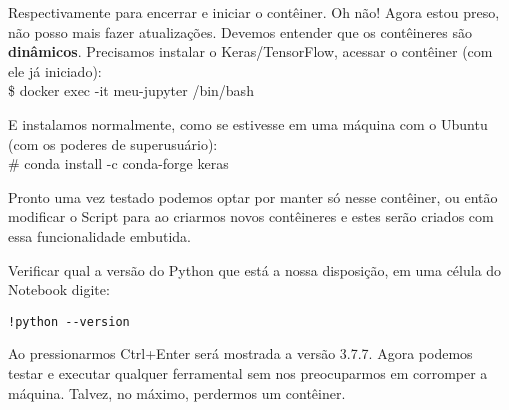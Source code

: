Respectivamente para encerrar e iniciar o contêiner. Oh não! Agora estou preso, não posso mais fazer atualizações. Devemos entender que os contêineres são \textbf{dinâmicos}. Precisamos instalar o Keras/TensorFlow, acessar o contêiner (com ele já iniciado): \\
{\ttfamily\$ docker exec -it meu-jupyter /bin/bash}

E instalamos normalmente, como se estivesse em uma máquina com o Ubuntu (com os poderes de superusuário): \\
{\ttfamily\# conda install -c conda-forge keras}

Pronto uma vez testado podemos optar por manter só nesse contêiner, ou então modificar o Script para ao criarmos novos contêineres e estes serão criados com essa funcionalidade embutida.

Verificar qual a versão do Python que está a nossa disposição, em uma célula do Notebook digite:
\begin{lstlisting}
!python --version
\end{lstlisting}

Ao pressionarmos Ctrl+Enter será mostrada a versão 3.7.7. Agora podemos testar e executar qualquer ferramental sem nos preocuparmos em corromper a máquina. Talvez, no máximo, perdermos um contêiner.
	
\clearpage